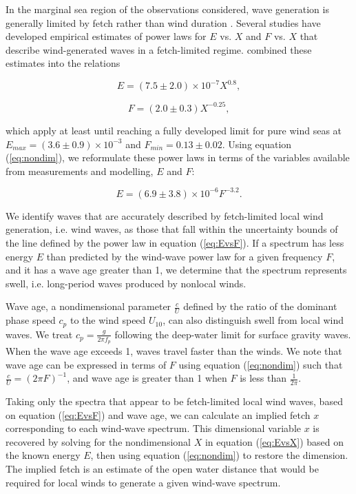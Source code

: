 \documentclass [11pt, proquest] {uwthesis}[2020/02/24]
\begin{document}
In the marginal sea region of the observations considered, wave generation is generally limited by fetch rather than wind duration \cite{Hasselmann1973,Thomson2014SwellOcean}. Several studies have developed empirical estimates of power laws for \(E\) vs. \(X\) and \(F\) vs. \(X\) that describe wind-generated waves in a fetch-limited regime. \cite{Young1999} combined these estimates into the relations


\begin{equation}
E = \left(7.5 \pm 2.0 \right) \times 10^{-7} X^{0.8},
\label{eq:EvsX}
\end{equation}

\begin{equation}
F = \left(2.0 \pm 0.3 \right) X^{-0.25},
\label{eq:FvsX}
\end{equation}

\noindent which apply at least until reaching a fully developed limit for pure wind seas at $E_{max} = \left(3.6 \pm 0.9\right) \times 10^{-3}$ and $F_{min} = 0.13 \pm 0.02$. Using equation (\ref{eq:nondim}), we reformulate these power laws in terms of the variables available from measurements and modelling, \(E\) and \(F\):


\begin{equation}
E = \left(6.9 \pm 3.8 \right) \times 10^{-6} F^{-3.2}.
\label{eq:EvsF}
\end{equation}

We identify waves that are accurately described by fetch-limited local wind generation, i.e. wind waves, as those that fall within the uncertainty bounds of the line defined by the power law in equation (\ref{eq:EvsF}). If a spectrum has less energy \(E\) than predicted by the wind-wave power law for a given frequency \(F\), and it has a wave age greater than 1, we determine that the spectrum represents swell, i.e. long-period waves produced by nonlocal winds.  

Wave age, a nondimensional parameter $\frac{c}{U}$ defined by the ratio of the dominant phase speed $c_p$ to the wind speed $U_{10}$, can also distinguish swell from local wind waves. We treat $c_p = \frac{g}{2 \pi f_p}$ following the deep-water limit for surface gravity waves. When the wave age exceeds 1, waves travel faster than the winds. We note that wave age can be expressed in terms of $F$ using equation (\ref{eq:nondim}) such that $\frac{c}{U} = \left(2 \pi F\right)^{-1}$, and wave age is greater than 1 when $F$ is less than $\frac{1}{2\pi}$.  

Taking only the spectra that appear to be fetch-limited local wind waves, based on equation (\ref{eq:EvsF}) and wave age, we can calculate an implied fetch \(x\) corresponding to each wind-wave spectrum. This dimensional variable \(x\) is recovered by solving for the nondimensional \(X\) in equation (\ref{eq:EvsX}) based on the known energy \(E\), then using equation (\ref{eq:nondim}) to restore the dimension. The implied fetch is an estimate of the open water distance that would be required for local winds to generate a given wind-wave spectrum.  
\end{document}
